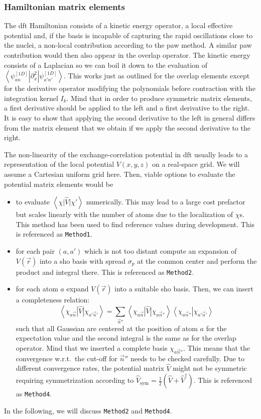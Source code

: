 \documentclass[oribibl]{llncs}
\newcommand{\um}[1]{_{\mathrm{#1}}}
\newcommand{\ttt}[1]{\texttt{#1}}
\newcommand{\braket}[2]{\left\langle \left. #1 \right| #2 \right\rangle}
\newcommand{\braketop}[3]{\left\langle \left. #1 \right| #2 \left| #3 \right. \right\rangle}
\begin{document}
\subsubsection{Hamiltonian matrix elements}
The \ac{dft} Hamiltonian consists of a kinetic energy operator,
a local effective potential 
and, if the basis is incapable of
capturing the rapid oscillations close to the nuclei,
a non-local contribution according to the \ac{paw} method.
A similar \ac{paw} contribution would then also appear in the overlap operator.
The kinetic energy consists of a Laplacian so we can boil it down to the evaluation
of $\braketop{ \psi^{[1D]}_{an} }{ \partial^2_x }{ \psi^{[1D]}_{a'n'} }$.
This works just as outlined for the overlap elements
except for the derivative operator modifying the polynomials before contraction with the integration kernel $I_k$.
Mind that in order to produce symmetric matrix elements,
a first derivative should be applied to the left and a first derivative to the right.
It is easy to show that applying the second derivative to the left in general differs from
the matrix element that we obtain if we apply the second derivative to the right.

The non-linearity of the exchange-correlation potential in \ac{dft} usually
leads to a representation of the local potential $V(x,y,z)$ on a real-space grid.
We will assume a Cartesian uniform grid here.
Then, viable options to evaluate the potential matrix elements would be
\begin{itemize}
%
\item to evaluate $\braketop{ \chi }{ \hat V }{ \chi' }$ numerically. 
This may lead to a large cost prefactor but scales linearly with the number of atoms due to the localization of $\chi$s.
This method has been used to find reference values during development. This is referenced as \ttt{Method1}.
%
\item for each pair $(a,a')$ which is not too distant
compute an expansion of $V(\vec r)$ into a \ac{sho} basis with spread $\sigma_p$
at the common center and perform the product and integral there. This is referenced as \ttt{Method2}.
%
\item for each atom $a$ expand $V(\vec r)$ into a suitable \ac{sho} basis. 
Then, we can insert a completeness relation: %
\begin{equation}
 \braketop{ \chi_{a\vec n} }{ \hat V }{ \chi_{a'\vec n'} } = \sum_{\vec n''}
 \braketop{ \chi_{a\vec n} }{ \hat V }{ \chi_{a\vec n''} } \braket{ \chi_{a\vec n''} }{ \chi_{a'\vec n'} }
\end{equation}
such that all Gaussian are centered at the position of atom $a$ for the expectation value
and the second integral is the same as for the overlap operator.
Mind that we inserted a complete basis $\chi_{a\vec n''}$. 
This means that the convergence w.r.t.~the cut-off for $\vec n''$ needs to be checked carefully.
Due to different convergence rates, the potential matrix $\hat V$ might not be symmetric
requiring symmetrization according to $\hat V\um{sym} = \frac 12 \left( \hat V + \hat V^\dagger \right)$. This is referenced as \ttt{Method4}.
%
\end{itemize}
In the following, we will discuss \ttt{Method2} and \ttt{Method4}.
\end{document}
